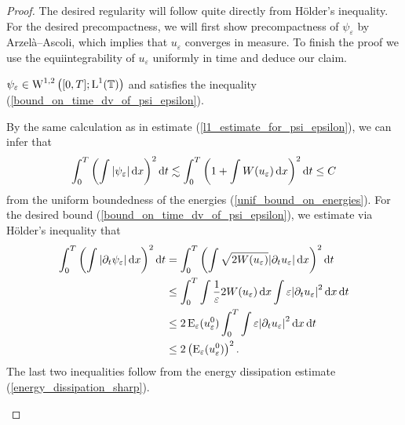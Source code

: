 \begin{proof}
	The desired regularity will follow quite directly from Hölder's inequality. 
	For the desired precompactness, we will first show precompactness of $ 
	\psi_{ \varepsilon } $ by Arzelà--Ascoli, which implies that $ u _{ 
	\varepsilon } $ converges in measure. 
	To finish the proof we use the equiintegrability of $ u_{ 
	\varepsilon } $ uniformly in time and deduce our claim.
	\begin{description}[wide=0pt]
		\item[Step 1:] $ \psi_{ \varepsilon } \in \operatorname{W}^{ 1 , 2 } \left( [ 0 , T 
		] ; \operatorname{L}^{ 1 } ( \operatorname{\mathbb{T}} ) \right) $ and satisfies the inequality 
		(\ref{bound_on_time_dv_of_psi_epsilon}).
		
		By the same calculation as in estimate 
		(\ref{l1_estimate_for_psi_epsilon}), we 
		can infer that
		\begin{equation*}
			\int_{ 0 }^{ T }
			\left(
			\int
			\abs{ \psi_{ \varepsilon } }
			\dd{ x }
			\right)^{ 2 }
			\dd{ t }
			\lesssim
			\int_{ 0 }^{ T }
			\left(
			1 + \int W ( u_{ \varepsilon } ) \dd{ x }
			\right)^{ 2 }
			\dd{ t } 
			\leq C
		\end{equation*}
		from the uniform boundedness of the energies 
		(\ref{unif_bound_on_energies}). For the desired bound 
		(\ref{bound_on_time_dv_of_psi_epsilon}), we estimate via Hölder's 
		inequality that
		\begin{align*}
			\int_{ 0 }^{ T }
			\left(
			\int
			\abs{ 
				\partial_{ t } \psi_{ \varepsilon }
			}
			\dd{ x }
			\right)^{ 2 }
			\dd{ t }
			& =
			\int_{ 0 }^{ T }
			\left(
			\int
			\sqrt{ 2 W ( u_{ \varepsilon } ) }
			\abs{ \partial_{ t } u_{ \varepsilon } }
			\dd{ x }
			\right)^{ 2 }
			\dd{ t }
			\\
			& \leq
			\int_{ 0 }^{ T }
			\int
			\frac{ 1 }{ \varepsilon }
			2 W ( u_{ \varepsilon } )
			\dd{ x }
			\int
			\varepsilon
			\abs{ \partial_{ t } u_{ \varepsilon } }^{ 2 }
			\dd{ x }
			\dd{ t }
			\\
			& \leq
			2 \operatorname{E}_{ \varepsilon } ( u_{ \varepsilon }^{ 0 } )
			\int_{ 0 }^{ T }
			\int
			\varepsilon
			\abs{ \partial_{ t } u_{ \varepsilon } }^{ 2 }
			\dd{ x }
			\dd{ t }
			\\
			& \leq
			2 \left(\operatorname{E}_{ \varepsilon } ( u_{ \varepsilon }^{ 0 } 
			)\right)^{ 2 }.
		\end{align*}
		The last two inequalities follow from the energy dissipation 
		estimate
		(\ref{energy_dissipation_sharp}).
		

\end{description}
\end{proof}
